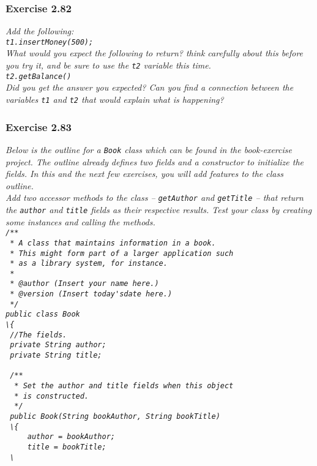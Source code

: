 \subsubsection*{Exercise 2.82}
\textit{Add the following: \\
\lstinline{t1.insertMoney(500);}\\
What would you expect the following to return? think carefully about this 
before you try it, and be sure to use the \lstinline{t2} variable this time. \\
\lstinline{t2.getBalance()}\\
Did you get the answer you expected? Can you find a connection between the 
variables \lstinline{t1} and \lstinline{t2} that would explain what is 
happening? }\\

\subsubsection*{Exercise 2.83}
\textit{Below is the outline for a \lstinline{Book} class which can be found 
in the book-exercise project. The outline already defines two fields and a 
constructor to initialize the fields. In this and the next few exercises, you 
will add features to the class outline. \\
Add two accessor methods to the class -- \lstinline{getAuthor} and 
\lstinline{getTitle} -- that return the \lstinline{author} and 
\lstinline{title} fields as their respective results. Test your class by 
creating some instances and calling the methods. \\
\lstinline{/**}\\
\lstinline{ * A class that maintains information in a book. }\\
\lstinline{ * This might form part of a larger application such }\\
\lstinline{ * as a library system, for instance. }\\
\lstinline{ * }\\
\lstinline{ * @author (Insert your name here.)}\\
\lstinline{ * @version (Insert today'sdate here.)}\\
\lstinline{ */}\\
\lstinline{public class Book}\\
\lstinline{\{}\\
\lstinline{	//The fields. }\\
\lstinline{	private String author;}\\
\lstinline{	private String title;}\\
\lstinline{	}\\
\lstinline{	/**}\\
\lstinline{	 * Set the author and title fields when this object }\\
\lstinline{	 * is constructed. }\\
\lstinline{	 */}\\
\lstinline{	public Book(String bookAuthor, String bookTitle)}\\
\lstinline{	\{}\\
\lstinline{		author = bookAuthor;}\\
\lstinline{		title = bookTitle;}\\
\lstinline{	\}}\\
